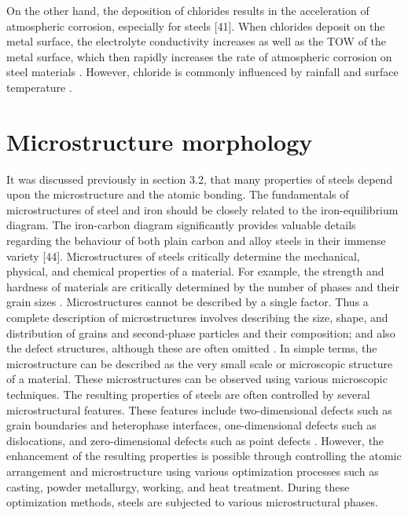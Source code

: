 \documentclass[12pt]{report}
\begin{document}
On the other hand, the deposition of chlorides results in the acceleration of atmospheric corrosion, especially for steels [41]. When chlorides deposit on the metal surface, the electrolyte conductivity increases as well as the TOW of the metal surface, which then rapidly increases the rate of atmospheric corrosion on steel materials \cite{marzorati2018green}. However, chloride is commonly influenced by rainfall and surface temperature \cite{cai2018influence}.

\section{Microstructure morphology} 
It was discussed previously in section 3.2, that many properties of steels depend upon the microstructure and the atomic bonding. The fundamentals of microstructures of steel and iron should be closely related to the iron-equilibrium diagram. The iron-carbon diagram significantly provides valuable details regarding the behaviour of both plain carbon and alloy steels in their immense variety [44]. 
Microstructures of steels critically determine the mechanical, physical, and chemical properties of a material. For example, the strength and hardness of materials are critically determined by the number of phases and their grain sizes \cite{clemens2017microstructure}. Microstructures cannot be described by a single factor. Thus a complete description of microstructures involves describing the size, shape, and distribution of grains and second-phase particles and their composition; and also the defect structures, although these are often omitted \cite{suryanarayana2017microstructure}. In simple terms, the microstructure can be described as the very small scale or microscopic structure of a material. These microstructures can be observed using various microscopic techniques.  
The resulting properties of steels are often controlled by several microstructural features. These features include two-dimensional defects such as grain boundaries and heterophase interfaces, one-dimensional defects such as dislocations, and zero-dimensional defects such as point defects \cite{clemens2017microstructure}. However, the enhancement of the resulting properties is possible through controlling the atomic arrangement and microstructure using various optimization processes such as casting, powder metallurgy, working, and heat treatment. During these optimization methods, steels are subjected to various microstructural phases.
\end{document}
